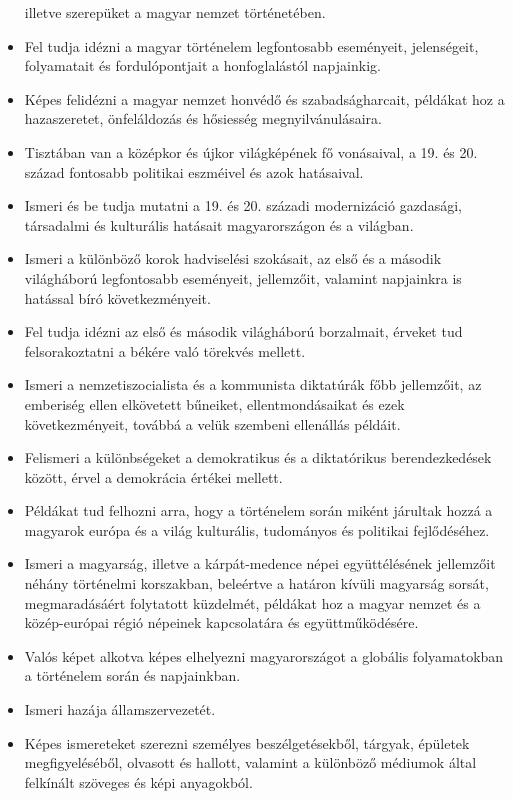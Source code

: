\begin{itemize}
  illetve szerepüket a magyar nemzet történetében.
\item
  Fel tudja idézni a magyar történelem legfontosabb eseményeit,
  jelenségeit, folyamatait és fordulópontjait a honfoglalástól
  napjainkig.
\item
  Képes felidézni a magyar nemzet honvédő és szabadságharcait, példákat
  hoz a hazaszeretet, önfeláldozás és hősiesség megnyilvánulásaira.
\item
  Tisztában van a középkor és újkor világképének fő vonásaival, a 19. és
  20. század fontosabb politikai eszméivel és azok hatásaival.
\item
  Ismeri és be tudja mutatni a 19. és 20. századi modernizáció
  gazdasági, társadalmi és kulturális hatásait magyarországon és a
  világban.
\item
  Ismeri a különböző korok hadviselési szokásait, az első és a második
  világháború legfontosabb eseményeit, jellemzőit, valamint napjainkra
  is hatással bíró következményeit.
\item
  Fel tudja idézni az első és második világháború borzalmait, érveket
  tud felsorakoztatni a békére való törekvés mellett.
\item
  Ismeri a nemzetiszocialista és a kommunista diktatúrák főbb
  jellemzőit, az emberiség ellen elkövetett bűneiket, ellentmondásaikat
  és ezek következményeit, továbbá a velük szembeni ellenállás példáit.
\item
  Felismeri a különbségeket a demokratikus és a diktatórikus
  berendezkedések között, érvel a demokrácia értékei mellett.
\item
  Példákat tud felhozni arra, hogy a történelem során miként járultak
  hozzá a magyarok európa és a világ kulturális, tudományos és politikai
  fejlődéséhez.
\item
  Ismeri a magyarság, illetve a kárpát-medence népei együttélésének
  jellemzőit néhány történelmi korszakban, beleértve a határon kívüli
  magyarság sorsát, megmaradásáért folytatott küzdelmét, példákat hoz a
  magyar nemzet és a közép-európai régió népeinek kapcsolatára és
  együttműködésére.
\item
  Valós képet alkotva képes elhelyezni magyarországot a globális
  folyamatokban a történelem során és napjainkban.
\item
  Ismeri hazája államszervezetét.
\item
  Képes ismereteket szerezni személyes beszélgetésekből, tárgyak,
  épületek megfigyeléséből, olvasott és hallott, valamint a különböző
  médiumok által felkínált szöveges és képi anyagokból.

\end{itemize}
